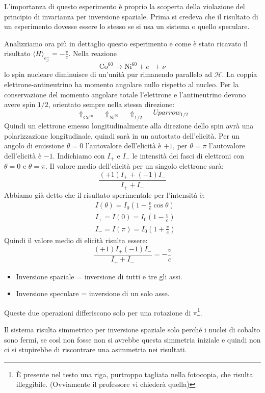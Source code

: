 L'importanza di questo esperimento è proprio la scoperta della violazione del 
principio di invarianza per inversione spaziale. Prima si credeva che il 
risultato di un esperimento
dovesse essere lo stesso se si usa un sistema o quello speculare.

Analizziamo ora più in dettaglio questo esperimento e 
come è stato ricavato il risultato $\langle 
H\rangle_{e_{\beta}^-}=-\frac{v}{c}$.
Nella reazione
\[
\text{Co}^{60}\rightarrow \text{Ni}^{60}+e^-+\bar{\nu}
\]
lo spin nucleare diminuisce di un'unità pur rimanendo parallelo ad 
$\mathcal{H}$. La coppia elettrone-antineutrino ha momento angolare nullo 
rispetto al nucleo.
Per la conservazione del momento angolare totale l'elettrone e l'antineutrino 
devono avere spin $1/2$, orientato sempre nella stessa direzione:
\[
\Uparrow_{\text{Co}^{60}}\quad\Uparrow_{\text{Ni}^{60}}\quad\Uparrow_{1/2}\quad\
Uparrow_{1/2}
\]
Quindi un elettrone emesso longitudinalmente alla direzione dello spin avrà 
una polarizzazione longitudinale, quindi sarà in un autostato dell'elicità.
Per un angolo di emissione $\theta=0$ l'autovalore dell'elicità è $+1$, per 
$\theta=\pi$ l'autovalore dell'elicità è $-1$.
Indichiamo con $I_+$ e $I_-$ le intensità dei fasci di elettroni con 
$\theta=0$ e $\theta=\pi$. Il valore medio dell'elicità per un singolo 
elettrone sarà:
\[
\frac{(+1)I_++(-1)I_-}{I_++I_-}
\]
Abbiamo già detto che il risultato sperimentale per l'intensità è:
\begin{align*}
&I(\theta)=I_0(1-\frac{v}{c}\cos\theta)\\
&I_+=I(0)=I_0(1-\frac{v}{c})\\
&I_-=I(\pi)=I_0(1+\frac{v}{c})
\end{align*}
Quindi il valore medio di elicità risulta essere:
\[
\frac{(+1)I_+(-1)I_-}{I_++I_-}=-\frac{v}{c}
\]
\begin{itemize}
 \item Inversione spaziale = inversione di tutti e tre gli assi.
 \item Inversione speculare = inversione di un solo asse.
\end{itemize}
Queste due operazioni differiscono solo per una rotazione di $\pi$\footnote{\`E
presente nel testo una riga, purtroppo tagliata nella fotocopia, che risulta
illeggibile. (Ovviamente il professore vi chiederà quella)}.

Il sistema risulta simmetrico per inversione spaziale solo perché i nuclei di 
cobalto sono fermi, se così non fosse non si avrebbe questa simmetria iniziale 
e quindi non
ci si stupirebbe di riscontrare una asimmetria nei risultati.
